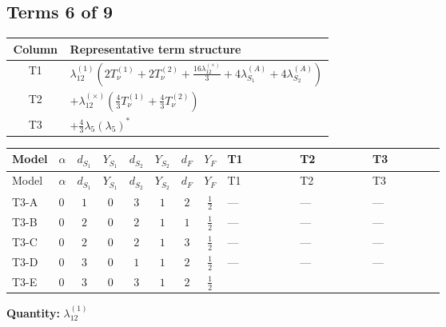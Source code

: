 \documentclass[8pt]{article}
\begin{document}
\begin{landscape}
\subsection*{Terms 6 of 9}
\begin{center}
\begin{tabular}{@{}c >{\raggedright\arraybackslash}p{0.82\linewidth}@{}}
\toprule
Column & Representative term structure \\
\midrule
T1 & \(\displaystyle {\lambda_{12}^{(1)}} \left(2 T_{\nu}^{(1)}+2 T_{\nu}^{(2)}+\frac{16 {\lambda_{12}^{(\times)}}}{3}+4 {\lambda_{S_1}^{(A)}}+4 {\lambda_{S_2}^{(A)}}\right)\) \\
\midrule
T2 & \(\displaystyle +{\lambda_{12}^{(\times)}} \left(\frac{4}{3} T_{\nu}^{(1)}+\frac{4}{3} T_{\nu}^{(2)}\right)\) \\
\midrule
T3 & \(\displaystyle +\frac{4}{3} {\lambda_5} \left({\lambda_5}\right)^{*}\) \\
\midrule
\bottomrule
\end{tabular}
\end{center}
\smallskip
\tiny
\begin{longtable}{@{}llcccccc >{\raggedright\arraybackslash}p{0.21\linewidth} >{\raggedright\arraybackslash}p{0.21\linewidth} >{\raggedright\arraybackslash}p{0.21\linewidth}@{}}
\toprule
Model & $\alpha$ & $d_{S_1}$ & $Y_{S_1}$ & $d_{S_2}$ & $Y_{S_2}$ & $d_F$ & $Y_F$ & T1 & T2 & T3 \\
\midrule
\endfirsthead
\toprule
Model & $\alpha$ & $d_{S_1}$ & $Y_{S_1}$ & $d_{S_2}$ & $Y_{S_2}$ & $d_F$ & $Y_F$ & T1 & T2 & T3 \\
\midrule
\endhead
T3-A & $0$ & $1$ & $0$ & $3$ & $1$ & $2$ & $\frac{1}{2}$ & --- & --- & --- \\
\midrule
T3-B & $0$ & $2$ & $0$ & $2$ & $1$ & $1$ & $\frac{1}{2}$ & --- & --- & --- \\
\midrule
T3-C & $0$ & $2$ & $0$ & $2$ & $1$ & $3$ & $\frac{1}{2}$ & --- & --- & --- \\
\midrule
T3-D & $0$ & $3$ & $0$ & $1$ & $1$ & $2$ & $\frac{1}{2}$ & --- & --- & --- \\
\midrule
T3-E & $0$ & $3$ & $0$ & $3$ & $1$ & $2$ & $\frac{1}{2}$ & \scriptsize\adjustbox{max width=\linewidth}{$\begin{gathered} {\lambda_{12}^{(1)}} \left(2 T_{\nu}^{(1)}+2 T_{\nu}^{(2)}+\frac{16 {\lambda_{12}^{(\times)}}}{3}+4 {\lambda_{S_1}^{(A)}}+4 {\lambda_{S_2}^{(A)}}\right)\end{gathered}$} & \scriptsize\adjustbox{max width=\linewidth}{$\begin{gathered} +{\lambda_{12}^{(\times)}} \left(\frac{4}{3} T_{\nu}^{(1)}+\frac{4}{3} T_{\nu}^{(2)}\right)\end{gathered}$} & \scriptsize\adjustbox{max width=\linewidth}{$\begin{gathered} +\frac{4}{3} {\lambda_5} \left({\lambda_5}\right)^{*}\end{gathered}$} \\
\midrule
\bottomrule
\end{longtable}
\clearpage
\noindent\textbf{Quantity: }$\lambda_{12}^{(1)}$\par\smallskip

\end{landscape}
\end{document}
